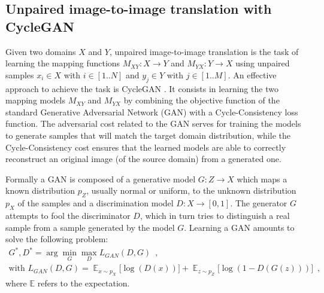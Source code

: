 
\subsection{Unpaired image-to-image translation with CycleGAN}

Given two domains $X$ and $Y$, unpaired image-to-image translation is the task of learning the mapping functions $M_{XY} : X \rightarrow Y$ and $M_{YX} : Y \rightarrow X$ using unpaired samples $x_i \in X$ with $i \in [1..N]$ and $y_j \in Y$ with $j \in [1..M]$. 
%
An effective approach to achieve the task is CycleGAN \citep{Zhu2017a}. 
It consists in learning the two mapping models $M_{XY}$ and $M_{YX}$ by combining the objective function of the standard Generative Adversarial Network (GAN) \citep{Goodfellow2014}  with a Cycle-Consistency loss function. The adversarial cost related to the GAN serves for training the models to generate samples that will match the target domain distribution, while the Cycle-Consistency cost ensures that the learned models are able to correctly reconstruct an original image (of the source domain) from a generated one.

Formally a GAN is composed of a generative model $G : Z \rightarrow X$ which maps a known distribution $p_Z$, usually normal or uniform, to the unknown distribution $p_X$ of the samples and a discrimination model $D : X \rightarrow [0,1]$. The generator $G$ attempts to fool the discriminator $D$, which in turn tries to distinguish a real sample from a sample generated by the model $G$. Learning a GAN amounts to solve the following problem:
$$
\begin{array}{c}
G^*, D^* = \arg\min_G\max_D L_{GAN}(D, G) \enspace,  \nonumber \\
\text{with }L_{GAN}(D, G) = \mathop{\mathbb{E}}_{x \sim p_X} \Big[\log (D(x))\Big] +
\mathop{\mathbb{E}}_{z\sim p_Z} \Big[\log (1-D(G(z)))\Big] \enspace, \nonumber
\end{array}
$$
\noindent where $\mathbb{E}$ refers to the expectation.

